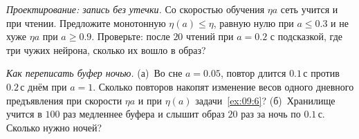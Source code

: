 \begin{exercise}[\lvlB]
\label{ex:09:6}
\emph{Проектирование: запись без утечки.} Со скоростью обучения $\eta a$ сеть учится и при чтении. Предложите монотонную $\eta(a)\le\eta$, равную нулю при $a\le0.3$ и не хуже $\eta a$ при $a\ge0.9$. Проверьте: после $20$ чтений при $a=0.2$ с подсказкой, где три чужих нейрона, сколько их вошло в образ?
\end{exercise}

\begin{exercise}[\lvlC]
\label{ex:09:7}
\emph{Как переписать буфер ночью.} (а)~Во сне $a=0.05$, повтор длится $0.1\,\text{с}$ против $0.2\,\text{с}$ днём при $a=1$. Сколько повторов накопят изменение весов одного дневного предъявления при скорости $\eta a$ и при $\eta(a)$ задачи~\ref{ex:09:6}? (б)~Хранилище учится в $100$ раз медленнее буфера и слышит образ $20$ раз за ночь по $0.1\,\text{с}$. Сколько нужно ночей?
\end{exercise}
